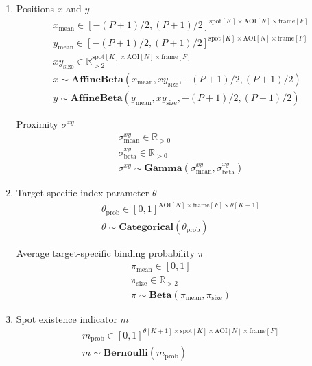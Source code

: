 \begin{enumerate}
    \item Positions $x$ and $y$
    \begin{gather*}
        x_\mathrm{mean} \in [-(P+1)/2, (P+1)/2]^{\mathrm{spot}[K] \times \mathrm{AOI}[N] \times \mathrm{frame}[F]} \\
        y_\mathrm{mean} \in [-(P+1)/2, (P+1)/2]^{\mathrm{spot}[K] \times \mathrm{AOI}[N] \times \mathrm{frame}[F]} \\
        xy_\mathrm{size} \in \mathbb{R}_{>2}^{\mathrm{spot}[K] \times \mathrm{AOI}[N] \times \mathrm{frame}[F]} \\
        x \sim \mathbf{AffineBeta} \left( x_\mathrm{mean}, xy_\mathrm{size}, -(P+1)/2, (P+1)/2 \right) \\
        y \sim \mathbf{AffineBeta} \left( y_\mathrm{mean}, xy_\mathrm{size}, -(P+1)/2, (P+1)/2 \right)
    \end{gather*}
    
    Proximity $\sigma^{xy}$
    \begin{gather*}
        \sigma^{xy}_\mathrm{mean} \in \mathbb{R}_{>0} \\
        \sigma^{xy}_\mathrm{beta} \in \mathbb{R}_{>0} \\
        \sigma^{xy} \sim \mathbf{Gamma}(\sigma^{xy}_\mathrm{mean}, \sigma^{xy}_\mathrm{beta})
    \end{gather*}
    
    \item Target-specific index parameter $\theta$
    \begin{gather*}
        \theta_\mathrm{prob} \in [0, 1]^{\mathrm{AOI}[N] \times \mathrm{frame}[F] \times \theta[K+1]} \\
        \theta \sim \mathbf{Categorical}(\theta_\mathrm{prob})
    \end{gather*}
    
    Average target-specific binding probability $\pi$
    \begin{gather*}
        \pi_\mathrm{mean} \in [0, 1] \\
        \pi_\mathrm{size} \in \mathbb{R}_{>2} \\
        \pi \sim \mathbf{Beta}(\pi_\mathrm{mean}, \pi_\mathrm{size})
    \end{gather*}
    
    \item Spot existence indicator $m$
    \begin{gather*}
        m_\mathrm{prob} \in [ 0, 1 ]^{\theta[K+1] \times \mathrm{spot}[K] \times \mathrm{AOI}[N] \times \mathrm{frame}[F]} \\
        m \sim \mathbf{Bernoulli}(m_\mathrm{prob})
    \end{gather*}
    

\end{enumerate}
